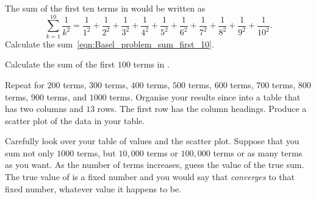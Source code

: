 \documentclass[a4paper,oneside,12pt]{article}
\begin{document}
\begin{problem}
\begin{packedenum}
  \item\label{subprob:Basel_problem_sum_first_10}
    The sum of the first ten terms in 
    would be written as
    \begin{equation}
    \label{eqn:Basel_problem_sum_first_10}
    \sum_{k=1}^{10} \frac{1}{k^2}
    =
    \frac{1}{1^2} + \frac{1}{2^2} + \frac{1}{3^2}
    +
    \frac{1}{4^2} + \frac{1}{5^2}
    +
    \frac{1}{6^2} + \frac{1}{7^2} + \frac{1}{8^2}
    +
    \frac{1}{9^2} + \frac{1}{10^2}.
    \end{equation}
    Calculate the sum~\eqref{eqn:Basel_problem_sum_first_10}.

  \item\label{subprob:Basel_problem_sum_first_100}
    Calculate the sum of the first $100$ terms in
    .

  \item\label{subprob:Basel_problem_sum_first_1000}
    Repeat  for $200$ terms,
    $300$ terms, $400$ terms, $500$ terms, $600$ terms, $700$ terms,
    $800$ terms, $900$ terms, and $1000$ terms.  Organise your results
    since  into a table that
    has two columns and $13$ rows.  The first row has the column
    headings.  Produce a scatter plot of the data in your table.

  \item\label{subprob:Basel_problem_approximate_value}
    Carefully look over your table of values and the scatter plot.
    Suppose that you sum not only $1000$ terms, but $10,000$ terms or
    $100,000$ terms or as many terms as you want.  As the number of
    terms increases, guess the value of the true sum.  The true value
    of  is a fixed number and you would
    say that  \emph{converges} to that
    fixed number, whatever value it happens to be.
  \end{packedenum}
\end{problem}
\end{document}
